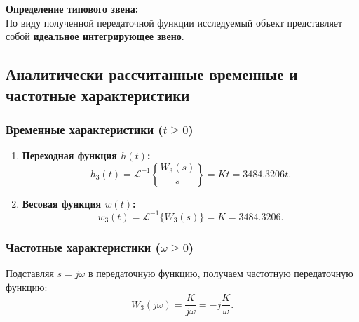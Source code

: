 \documentclass[12pt, a4paper]{article}
\begin{document}
\textbf{Определение типового звена:} \\
По виду полученной передаточной функции исследуемый объект представляет собой \textbf{идеальное интегрирующее звено}.

\subsection{Аналитически рассчитанные временные и частотные характеристики}

\subsubsection{Временные характеристики ($t \ge 0$)}

\begin{enumerate}
    \item \textbf{Переходная функция $h(t)$:}
    \begin{equation}
        h_3(t) = \mathcal{L}^{-1}\left\{\frac{W_3(s)}{s}\right\} = Kt = 3484.3206t.
    \end{equation}

    \item \textbf{Весовая функция $w(t)$:}
    \begin{equation}
        w_3(t) = \mathcal{L}^{-1}\{W_3(s)\} = K = 3484.3206.
    \end{equation}
\end{enumerate}

\subsubsection{Частотные характеристики ($\omega \ge 0$)}

Подставляя $s = j\omega$ в передаточную функцию, получаем частотную передаточную функцию:
\begin{equation*}
    W_3(j\omega) = \frac{K}{j\omega} = -j\frac{K}{\omega}.
\end{equation*}
\end{document}
